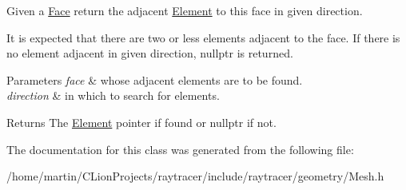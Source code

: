 Given a \hyperlink{classraytracer_1_1Face}{Face} return the adjacent \hyperlink{classraytracer_1_1Element}{Element} to this face in given direction. 

It is expected that there are two or less elements adjacent to the face. If there is no element adjacent in given direction, nullptr is returned.


\begin{DoxyParams}{Parameters}
{\em face} & whose adjacent elements are to be found. \\
\hline
{\em direction} & in which to search for elements. \\
\hline
\end{DoxyParams}
\begin{DoxyReturn}{Returns}
The \hyperlink{classraytracer_1_1Element}{Element} pointer if found or nullptr if not. 
\end{DoxyReturn}


The documentation for this class was generated from the following file\+:\begin{DoxyCompactItemize}
\item 
/home/martin/\+C\+Lion\+Projects/raytracer/include/raytracer/geometry/Mesh.\+h\end{DoxyCompactItemize}

